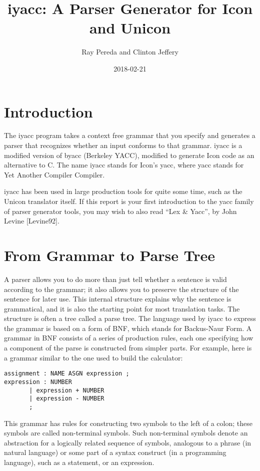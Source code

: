 \documentclass[letterpaper,12pt]{article}
\title{iyacc: A Parser Generator for Icon and Unicon}
\author{Ray Pereda and Clinton Jeffery}
\date{2018-02-21}
\begin{document}
\maketitle

\section{Introduction}

The iyacc program takes a context free grammar that you specify and
generates a parser that recognizes whether an input conforms to that
grammar.  iyacc is a modified version of byacc (Berkeley YACC),
modified to generate Icon code as an alternative to C.  The name iyacc
stands for Icon’s yacc, where yacc stands for Yet Another Compiler
Compiler.

iyacc has been used in large production tools for quite some time,
such as the Unicon translator itself.  If this report is your first
introduction to the yacc family of parser generator tools, you may
wish to also read ``Lex \& Yacc'', by John Levine [Levine92].

\section{From Grammar to Parse Tree}

A parser allows you to do more than just tell whether a sentence is valid 
according to the grammar; it also allows you to preserve the structure of the 
sentence for later use. This internal structure explains why the sentence
is grammatical, and it is also the starting point for most translation
tasks.  The structure is often a tree called a parse tree.
The language used by iyacc to express the grammar is based on a form
of BNF, which stands for Backus-Naur Form. A grammar in BNF consists
of a series of production rules, each one specifying how a component
of the parse is constructed from simpler parts. For example, here is
a grammar similar to the one used to build the calculator:

\begin{verbatim}
assignment : NAME ASGN expression ;
expression : NUMBER
	   | expression + NUMBER
	   | expression - NUMBER
	   ;
\end{verbatim}

This grammar has rules for constructing two symbols to the left of a
colon; these symbols are called non-terminal symbols. Such non-terminal
symbols denote an abstraction for a 
logically related sequence of symbols, analogous to a phrase (in natural
language) or some part of a syntax construct (in a programming
language), such as a statement, or an expression.
\end{document}
